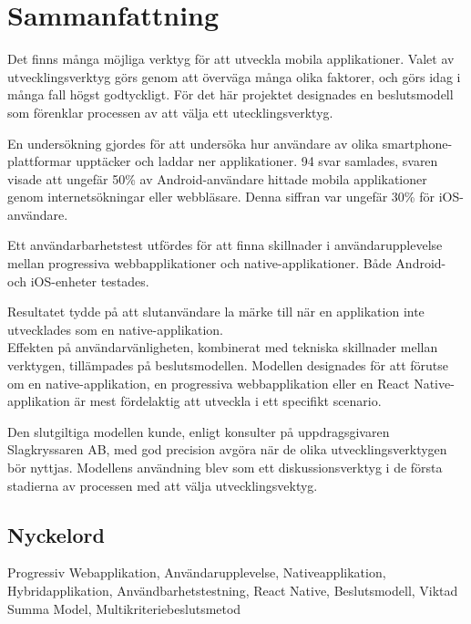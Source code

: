 \newpage
\section*{Sammanfattning}
Det finns många möjliga verktyg för att utveckla mobila applikationer. Valet av utvecklingsverktyg görs genom att överväga många olika faktorer, och görs idag i många fall högst godtyckligt. För det här projektet designades en beslutsmodell som förenklar processen av att välja ett utecklingsverktyg.

En undersökning gjordes för att undersöka hur användare av olika smartphone-plattformar upptäcker och laddar ner applikationer. 94 svar samlades, svaren visade att ungefär 50\% av Android-användare hittade mobila applikationer genom internetsökningar eller webbläsare. Denna siffran var ungefär 30\% för iOS-användare.

Ett användarbarhetstest utfördes för att finna skillnader i användarupplevelse mellan progressiva webbapplikationer och native-applikationer. Både Android- och iOS-enheter testades.

Resultatet tydde på att slutanvändare la märke till när en applikation inte utvecklades som en native-applikation.\\ Effekten på användarvänligheten, kombinerat med tekniska skillnader mellan verktygen, tillämpades på beslutsmodellen. Modellen designades för att förutse om en native-applikation, en progressiva webbapplikation eller en React Native-applikation är mest fördelaktig att utveckla i ett specifikt scenario.

Den slutgiltiga modellen kunde, enligt konsulter på uppdragsgivaren Slagkryssaren AB, med god precision avgöra när de olika utvecklingsverktygen bör nyttjas. Modellens användning blev som ett diskussionsverktyg i de första stadierna av processen med att välja utvecklingsvektyg.


\subsection*{Nyckelord}

Progressiv Webapplikation, Användarupplevelse, Nativeapplikation,\\ Hybridapplikation, Användbarhetstestning, React Native, Beslutsmodell, Viktad Summa Model, Multikriteriebeslutsmetod


